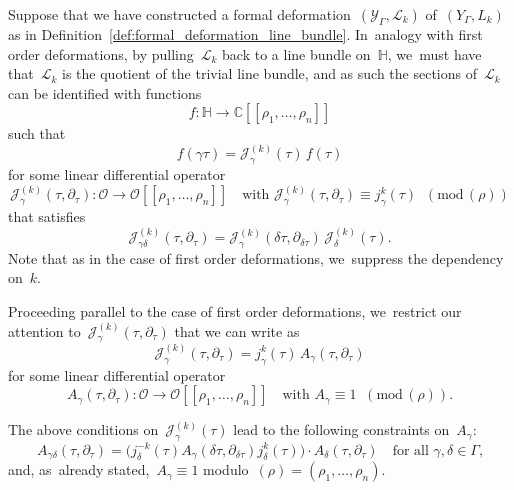 \documentclass[JEP,XML,SOM,Unicode,published]{cedram}
\theoremstyle{plain}
\theoremstyle{definition}
\newcommand{\tx}{\text}
\newcommand{\bbC}{\ensuremath{\mathbb{C}}}
\newcommand{\cJ}{\ensuremath{\mathcal{J}}}
\newcommand{\cL}{\ensuremath{\mathcal{L}}}
\newcommand{\cO}{\ensuremath{\mathcal{O}}}
\newcommand{\cY}{\ensuremath{\mathcal{Y}}}
\newcommand{\defcol}{\mathrel{:}}
\newcommand{\llbrkt}{[\![}
\newcommand{\rrbrkt}{]\!]}
\renewcommand{\pmod}[1]{\;(\mathrm{mod}\, #1)}
\newcommand{\HS}{\ensuremath{\mathbb{H}}}
\let\Ga\Gamma
\let\ga\gamma
\begin{document}
Suppose that we have constructed a formal deformation~$(\cY_\Ga,\cL_k)$ of~$(Y_\Ga,L_k)$ as in Definition~\ref{def:formal_deformation_line_bundle}. In~analogy with first order deformations, by pulling~$\cL_k$ back to a line bundle on~$\HS$, we~must have that~$\cL_k$ is the quotient of the trivial line bundle, and as such the sections of~$\cL_k$ can be identified with functions
\begin{equation*}
f \defcol \HS \to \bbC \llbrkt \rho_1,\ldots,\rho_n\rrbrkt
\end{equation*}
such that
\begin{equation*}
f(\ga\tau) = \cJ^{(k)}_\ga(\tau)\, f(\tau)
\end{equation*}
for some linear differential operator
\begin{equation*}
\cJ^{(k)}_\ga(\tau, \partial_\tau) \defcol \cO \to \cO\llbrkt \rho_1,\ldots,\rho_n\rrbrkt
\quad
\tx{with\ }
\cJ^{(k)}_\ga(\tau, \partial_\tau)
\equiv
j_\ga^k(\tau)
\;\pmod{(\rho)}
\end{equation*}
that satisfies
\begin{equation*}
\cJ^{(k)}_{\ga\delta}(\tau, \partial_\tau)
=
\cJ^{(k)}_\ga(\delta\tau, \partial_{\delta\tau})\, \cJ^{(k)}_\delta(\tau)
\tx{.}
\end{equation*}
Note that as in the case of first order deformations, we~suppress the dependency on~$k$.

Proceeding parallel to the case of first order deformations, we~restrict our attention to~$\cJ^{(k)}_\ga(\tau, \partial_\tau)$ that we can write as
\begin{equation*}
\cJ^{(k)}_\ga(\tau, \partial_\tau)
=
j_\ga^k(\tau)\,
A_\ga(\tau, \partial_\tau)
\end{equation*}
for some linear differential operator
\begin{equation*}
A_\ga(\tau, \partial_\tau) \defcol \cO \to \cO\llbrkt \rho_1,\ldots,\rho_n\rrbrkt
\quad
\tx{with\ }
A_\ga
\equiv
1
\;\pmod{(\rho)}
\tx{.}
\end{equation*}

The above conditions on~$\cJ^{(k)}_\ga(\tau)$ lead to the following constraints on~$A_\ga$:
\begin{equation}
\label{eq:formal_deformation_cocycle_line_bundle_relation}
A_{\ga\delta}(\tau, \partial_\tau)
=
\bigl(j_\delta^{-k}(\tau) A_\ga(\delta\tau, \partial_{\delta\tau}) j_\delta^k(\tau) \bigr)
\cdot
A_\delta(\tau, \partial_\tau)
\quad
\tx{for all\ }\ga, \delta \in \Ga\tx{,}
\end{equation}
and, as~already stated,~$A_\ga \equiv 1$ modulo~$(\rho) = (\rho_1,\ldots,\rho_n)$.
\end{document}
